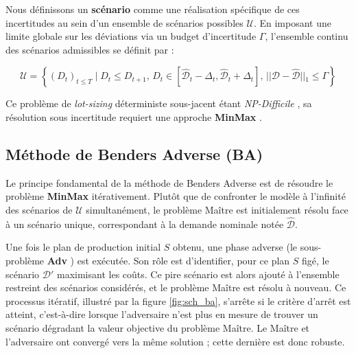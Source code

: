 \documentclass[12pt, a4paper, twoside]{report}
\numberwithin{equation}{section}
\newcommand{\mmx}{\textbf{MinMax} }
\newcommand{\adv}{\textbf{Adv} }
\begin{document}
	Nous définissons un \textbf{scénario} comme une réalisation spécifique de ces incertitudes au sein d'un ensemble de scénarios possibles $\mathcal{U}$. En imposant une limite globale sur les déviations via un budget d'incertitude $\Gamma$, l'ensemble continu des scénarios admissibles se définit par :
	
	\begin{equation}
		\mathcal{U} = \left\{ (D_t)_{t\leq T} \mid D_t \leq D_{t+1},\, D_t \in [\hat{\mathcal{D}}_t - \Delta_t, \hat{\mathcal{D}}_t + \Delta_t],\, \vert{}\vert{}\mathcal{D}-\hat{\mathcal{D}}\vert{}\vert{}_1 \leq \Gamma \right\}
	\end{equation}
	
	Ce problème de \textit{lot-sizing} déterministe sous-jacent étant \textit{NP-Difficile} \cite{computational_complexity_gabriel}, sa résolution sous incertitude requiert une approche \mmx.
	
	\subsection{Méthode de Benders Adverse (BA)}
	
	Le principe fondamental de la méthode de Benders Adverse est de résoudre le problème \mmx itérativement. Plutôt que de confronter le modèle à l'infinité des scénarios de $\mathcal{U}$ simultanément, le problème Maître est initialement résolu face à un scénario unique, correspondant à la demande nominale notée $\hat{\mathcal{D}}$.
	
	Une fois le plan de production initial $S$ obtenu, une phase adverse (le sous-problème \adv) est exécutée. Son rôle est d'identifier, pour ce plan $S$ figé, le scénario $\mathcal{D}'$ maximisant les coûts. Ce pire scénario est alors ajouté à l'ensemble restreint des scénarios considérés, et le problème Maître est résolu à nouveau. Ce processus itératif, illustré par la figure \ref{fig:sch_ba}, s'arrête si le critère d'arrêt est atteint, c'est-à-dire lorsque l'adversaire n'est plus en mesure de trouver un scénario dégradant la valeur objective du problème Maître. Le Maître et l'adversaire ont convergé vers la même solution ; cette dernière est donc robuste.
	
\end{document}
